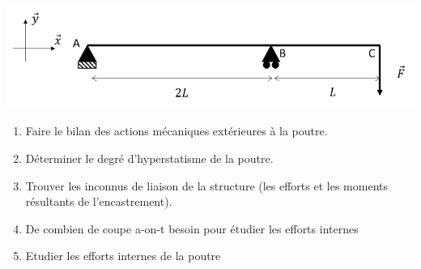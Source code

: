 \documentclass[lecture.tex]{subfiles}
\begin{document}
\exercice{}


\begin{center}
  \includegraphics[scale=0.5]{exo-poutre-en-appuie-efforts.png}
\end{center}

\begin{enumerate}
  \item Faire le bilan des actions mécaniques extérieures à la poutre.
  \item Déterminer le degré d’hyperstatisme de la poutre.
  \item Trouver les inconnus de liaison de la structure (les efforts et les moments résultants de l’encastrement).
  \item De combien de coupe a-on-t besoin pour étudier les efforts internes
  \item Etudier les efforts internes de la poutre
\end{enumerate}

\finexercice
\end{document}
